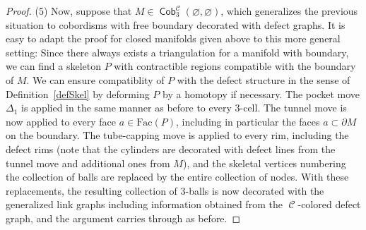\documentclass[pdftex]{sigma}
\DeclareMathOperator{\Cob}{\mathsf{Cob}}
\DeclareMathOperator{\calc}{\mathcal{C}}
\numberwithin{equation}{section}
\theoremstyle{definition}
\begin{document}
\begin{proof}
 (5) Now, suppose that $M \in \Cob_3^{\mathcal{C}}(\varnothing, \varnothing)$, which generalizes the previous situation to cobordisms with free boundary decorated with defect graphs. It is easy to adapt the proof for closed manifolds given above to this more general setting: Since there always exists a triangulation for a manifold with boundary, we can find a skeleton $P$ with contractible regions compatible with the boundary of $M$. We can ensure compatiblity of $P$ with the defect structure in the sense of Definition~\ref{defSkel} by deforming $P$ by a homotopy if necessary. The pocket move $\Delta_1$ is applied in the same manner as before to every 3-cell. The tunnel move  is now applied to every face $a \in \mathrm{Fac}(P)$, including in particular the faces $a \subset \partial M$ on the boundary. The tube-capping move is applied to every rim, including the defect rims (note that the cylinders are decorated with defect lines from the tunnel move and additional ones from $M$), and the skeletal vertices numbering the collection of balls are replaced by the entire collection of nodes. With these replacements, the resulting collection of 3-balls is now decorated with the generalized link graphs including information obtained from the $\calc$-colored defect graph, and the argument carries through as before. %
\end{proof}
\end{document}
